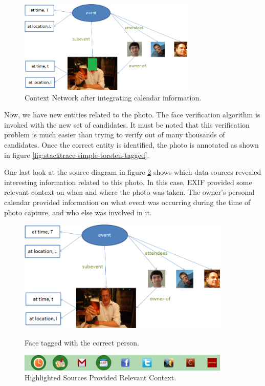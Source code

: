 \begin{figure}[h]
\centering
\includegraphics[width=0.75\textwidth]{media/chapter4/stacktrace/context-network-torsten.png}
\caption{Context Network after integrating calendar information.}
\label{fig:stacktrace-simple-context-network}
\end{figure}

Now, we have new entities related to the photo. The face verification algorithm is invoked with the new set of candidates. It must be noted that this verification problem is much easier than trying to verify out of many thousands of candidates. Once the correct entity is identified, the photo is annotated as shown in figure \ref{fig:stacktrace-simple-torsten-tagged}.

One last look at the source diagram in figure \ref{fig:stacktrace-simple-all} shows which data sources revealed interesting information related to this photo. In this case, EXIF provided some relevant context on when and where the photo was taken. The owner's personal calendar provided information on what event was occurring during the time of photo capture, and who else was involved in it.


\begin{figure}[h!]
\begin{minipage}[b]{0.9\linewidth}
\centering
\includegraphics[width=0.9\textwidth]{media/chapter4/stacktrace/torsten-tagged.png}
\caption{Face tagged with the correct person.}
\label{fig:stacktrace-simple-torsten-tagged}
\end{minipage}
\hspace{0.5cm}
\begin{minipage}[b]{0.9\linewidth}
\centering
\includegraphics[width=0.9\textwidth]{media/chapter4/stacktrace/time-space-calendar-selected.png}
\caption{Highlighted Sources Provided Relevant Context.}
\label{fig:stacktrace-simple-all}
\end{minipage}
\end{figure}


